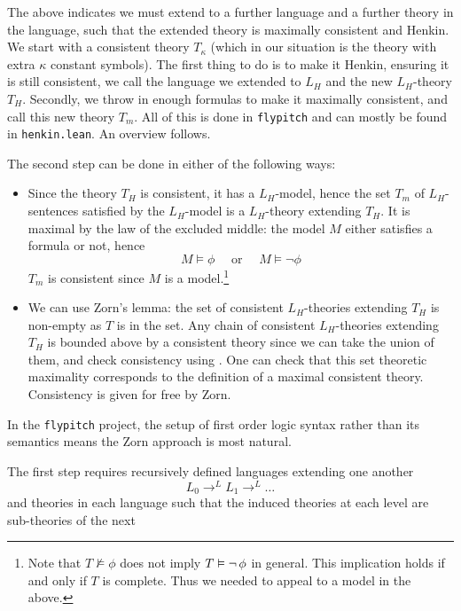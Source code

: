 
The above indicates we must extend to a further language and a further theory
in the language, such that the extended theory is maximally consistent and Henkin.
We start with a consistent theory $T_{\kappa}$
(which in our situation is the theory with extra $\kappa$ constant symbols).
The first thing to do is to make it Henkin, ensuring it is still consistent,
we call the language we extended to $L_{H}$ and the new $L_{H}$-theory $T_{H}$.
Secondly, we throw in enough formulas to make it maximally consistent,
and call this new theory $T_{m}$.
All of this is done in \texttt{flypitch} and can mostly be found in \texttt{henkin.lean}.
An overview follows.

The second step can be done in either of the following ways:
\begin{itemize}
  \item Since the theory $T_{H}$ is consistent, it has a $L_{H}$-model,
        hence the set $T_{m}$ of $L_{H}$-sentences satisfied by the $L_{H}$-model is a
        $L_{H}$-theory extending $T_{H}$.
        It is maximal by the law of the excluded middle:
        the model $M$ either satisfies a formula or not,
        hence
        \[ M \vDash \phi \quad \text{ or } \quad M \vDash \neg \phi \]
        $T_{m}$ is consistent since $M$ is a model.\footnote{Note that
          $T \nvDash \phi$ does not imply $T \vDash \neg\, \phi$ in general.
          This implication holds if and only if $T$ is complete.
          Thus we needed to appeal to a model in the above.}
  \item We can use Zorn's lemma: the set of consistent $L_{H}$-theories extending
        $T_{H}$ is non-empty as $T$ is in the set.
        Any chain of consistent $L_{H}$-theories extending $T_{H}$ is bounded
        above by a consistent theory since we can take the union of them,
        and check consistency using .
        One can check that this set theoretic maximality corresponds to
        the definition of a maximal consistent theory.
        Consistency is given for free by Zorn.
\end{itemize}
In the \texttt{flypitch} project, the setup of first order logic
syntax rather than its semantics means the Zorn approach is most natural.

The first step requires recursively defined languages extending one another
\[ L_{0} \to^{L} L_{1} \to^{L} \dots \]
and theories in each language such that the induced theories
at each level are sub-theories of the next

